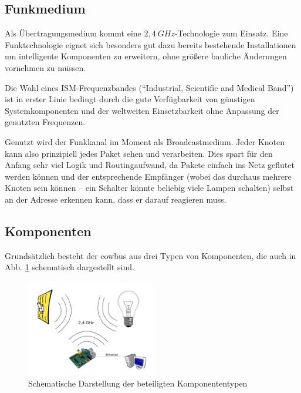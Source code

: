 \documentclass{IEEEtran}
\begin{document}
    \subsection{Funkmedium}
        Als Übertragungsmedium kommt eine $2,4~GHz$-Technologie
        zum Einsatz. Eine Funktechnologie eignet sich besonders gut dazu
        bereits bestehende Installationen um intelligente Komponenten
        zu erweitern, ohne größere bauliche Änderungen vornehmen zu müssen.

        Die Wahl eines ISM-Frequenzbandes (\enquote{Industrial, Scientific and Medical Band})
        ist in erster Linie bedingt durch die gute Verfügbarkeit von günstigen
        Systemkomponenten und der weltweiten Einsetzbarkeit ohne Anpassung der
        genutzten Frequenzen.

        Genutzt wird der Funkkanal im Moment als Broadcastmedium.
        Jeder Knoten kann also prinzipiell jedes Paket sehen und verarbeiten.
        Dies spart für den Anfang sehr viel Logik und Routingaufwand,
        da Pakete einfach ins Netz geflutet werden können und der entsprechende
        Empfänger (wobei das durchaus mehrere Knoten sein können -- ein Schalter
        könnte beliebig viele Lampen schalten) selbst an der Adresse erkennen
        kann, dass er darauf reagieren muss.

    \subsection{Komponenten}
        Grundsätzlich besteht der cowbus aus drei Typen von Komponenten,
        die auch in Abb. \ref{fig:comp} schematisch dargestellt sind.

        \begin{figure}
            \centering
            \includegraphics[width=0.5\textwidth]{img/system}
            \caption{Schematische Darstellung der beteiligten Komponententypen}
            \label{fig:comp}
        \end{figure}
\end{document}
